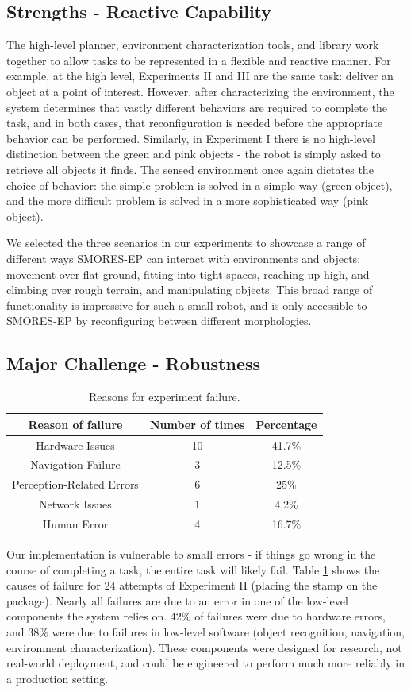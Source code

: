 \documentclass[journal]{IEEEtran}
\begin{document}
\subsection{Strengths - Reactive Capability}
%
The high-level planner, environment characterization tools, and library work together to allow tasks to be represented in a flexible and reactive manner. For example, at the high level, Experiments II and III are the same task: deliver an object at a point of interest.  However, after characterizing the environment, the system determines that vastly different behaviors are required to complete the task, and in both cases, that reconfiguration is needed before the appropriate behavior can be performed. Similarly, in Experiment I there is no high-level distinction between the green and pink objects - the robot is simply asked to retrieve all objects it finds.  The sensed environment once again dictates the choice of behavior: the simple problem is solved in a simple way (green object), and the more difficult problem is solved in a more sophisticated way (pink object).

We selected the three scenarios in our experiments to showcase a range of different ways SMORES-EP can interact with environments and objects: movement over flat ground, fitting into tight spaces, reaching up high, and climbing over rough terrain, and manipulating objects.  This broad range of functionality is impressive for such a small robot, and is only accessible to SMORES-EP by reconfiguring between different morphologies.
%
\subsection{Major Challenge - Robustness}
%
\begin{table}
\centering
\begin{tabular}{|c|c|c|}
\hline
\textbf{Reason of failure} & \textbf{Number of times} & \textbf{Percentage}\\ 
\hline
Hardware Issues & 10 & 41.7\% \\ 
\hline
Navigation Failure & 3 & 12.5\% \\ 
\hline
Perception-Related Errors & 6 & 25\% \\ 
\hline
Network Issues & 1 & 4.2\% \\ 
\hline
Human Error & 4 & 16.7\% \\ 
\hline
\end{tabular}
\caption{Reasons for experiment failure.}
\label{table:errors}
\end{table}
%
Our implementation is vulnerable to small errors - if things go wrong in the course of completing a task, the entire task will likely fail. 
Table \ref{table:errors} shows the causes of failure for 24 attempts of Experiment II (placing the stamp on the package).  
Nearly all failures are due to an error in one of the low-level components the system relies on.
42\% of failures were due to hardware errors, and 38\% were due to failures in low-level software (object recognition, navigation, environment characterization). 
These components were designed for research, not real-world deployment, and could be engineered to perform much more reliably in a production setting.
\end{document}
